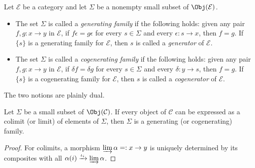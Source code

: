 \begin{definition}\label{def:generators}
	Let $\mathcal{E}$ be a category and let $\Sigma$ be a nonempty small
	subset of $\Obj(\mathcal{E})$.
	\begin{itemize}
		\item The set $\Sigma$ is called a \emph{generating family} if the
		following holds: given any pair $f,g:x\to y$ in $\mathcal{E}$, if
		$f\epsilon=g\epsilon$ for every $s\in\Sigma$ and every
		$\epsilon:s\to x$, then $f=g$. If $\{s\}$ is a generating family for
		$\mathcal{E}$, then $s$ is called a \emph{generator} of $\mathcal{E}$.
		\item The set $\Sigma$ is called a \emph{cogenerating family} if the
		following holds: given any pair $f,g:x\to y$ in $\mathcal{E}$, if
		$\delta f=\delta g$ for every $s\in\Sigma$ and every
		$\delta:y\to s$, then $f=g$. If $\{s\}$ is a cogenerating family for
		$\mathcal{E}$, then $s$ is called a \emph{cogenerator} of $\mathcal{E}$.
	\end{itemize}
\end{definition}

The two notions are plainly dual.

\begin{lemma}\label{prop:generator-via-limit}
	Let $\Sigma$ be a small subset of $\Obj(\mathcal{C})$. If every object of
	$\mathcal{C}$ can be expressed as a colimit (or limit) of elements of
	$\Sigma$, then $\Sigma$ is a generating (or cogenerating) family.
\end{lemma}
\begin{proof}
	For colimits, a morphism $\varinjlim\alpha=:x\to y$ is uniquely determined
	by its composites with all $\alpha(i)\xrightarrow{\iota_i}\varinjlim\alpha$.
\end{proof}

